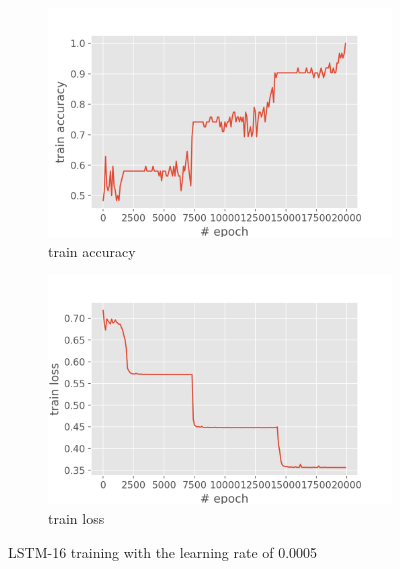 \documentclass[12pt,article]{article}
\begin{document}
\begin{figure}[H]
\centering
\begin{subfigure}{.5\textwidth}
    \centering
    \includegraphics[scale=0.6]{LSTM-16_parity_train_accuracy.png} \par
    \caption{train accuracy}
\end{subfigure}%
\begin{subfigure}{.5\textwidth}
    \centering
    \includegraphics[scale=0.6]{LSTM-16_parity_train_loss.png} \par
    \caption{train loss}
\end{subfigure}
\caption{LSTM-16 training with the learning rate of 0.0005}
\label{fig:lstm16-training}
\end{figure}
\end{document}
